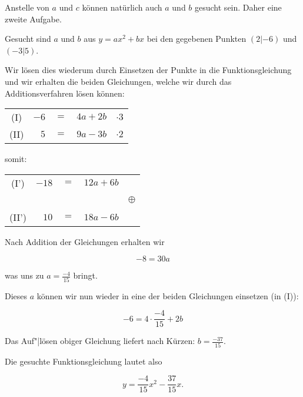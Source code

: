 \begin{beispiel}{}{}
  Anstelle von $a$ und $c$ können natürlich auch $a$ und $b$ gesucht
  sein. Daher eine zweite Aufgabe.

  Gesucht sind $a$ und $b$ aus $y = ax^2 + bx$ bei den gegebenen
\vspace{1mm}
  Punkten $(2|-6)$ und $(-3|5)$.

  \vspace{1mm}

  Wir lösen dies wiederum durch Einsetzen der Punkte in die
  Funktionsgleichung und wir erhalten die beiden Gleichungen, welche
  wir durch das Additionsverfahren lösen können:

  \vspace{2mm}

  \begin{tabular}{c | r  c  r | c}
    (I)  &  $-6$ & $=$ & $4a + 2b$ & $\cdot{} 3$ \\
    (II) &   $5$ & $=$ & $9a - 3b$ & $\cdot{} 2$ \\
  \end{tabular}

  \vspace{2mm}

  somit:

  \vspace{2mm}
  
  \begin{tabular}{c | r  c  r | c}
    (I')  & $-18$ & $=$ & $12a + 6b$ &\, \\
     \,   & \,    & \,&   \,       & $\oplus$\\
    (II') &  $10$ & $=$ & $18a - 6b$ &\, \\
  \end{tabular}
\vspace{1mm}

  Nach Addition der Gleichungen erhalten wir

  $$-8 = 30a$$

  was uns zu $a=\frac{-4}{15}$ bringt.

Dieses $a$ können wir nun wieder in eine der beiden Gleichungen
einsetzen (\zB in (I)):

$$-6=4\cdot{}\frac{-4}{15} + 2b$$

Das Auf"|lösen obiger Gleichung liefert nach Kürzen: $b=\frac{-37}{15}$.

Die gesuchte Funktionsgleichung lautet also

$$y = \frac{-4}{15} x^2 - \frac{37}{15} x.$$

\end{beispiel}

